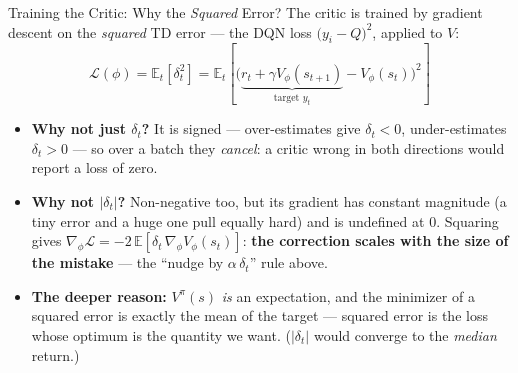 \begin{frame}{Training the Critic: Why the \emph{Squared} Error?}
The critic is trained by gradient descent on the \emph{squared} TD error --- the DQN loss $\big(y_i - Q\big)^2$, applied to $V$:
$$\mathcal{L}(\phi) = \mathbb{E}_t\!\left[\delta_t^2\right] = \mathbb{E}_t\!\left[\bigl(\underbrace{r_t + \gamma V_\phi(s_{t+1})}_{\text{target } y_t} - V_\phi(s_t)\bigr)^2\right]$$
\begin{itemize}
    \item \textbf{Why not just $\delta_t$?} It is signed --- over-estimates give $\delta_t < 0$, under-estimates $\delta_t > 0$ --- so over a batch they \emph{cancel}: a critic wrong in both directions would report a loss of zero.
    \pause
    \item \textbf{Why not $|\delta_t|$?} Non-negative too, but its gradient has constant magnitude (a tiny error and a huge one pull equally hard) and is undefined at $0$. Squaring gives $\nabla_\phi \mathcal{L} = -2\,\mathbb{E}[\delta_t\, \nabla_\phi V_\phi(s_t)]$: \textbf{the correction scales with the size of the mistake} --- the ``nudge by $\alpha\,\delta_t$'' rule above.
    \pause
    \item \textbf{The deeper reason:} $V^{\pi}(s)$ \emph{is} an expectation, and the minimizer of a squared error is exactly the mean of the target --- squared error is the loss whose optimum is the quantity we want. ($|\delta_t|$ would converge to the \emph{median} return.)
\end{itemize}
\end{frame}
